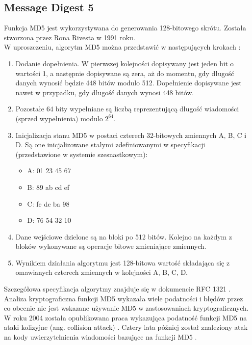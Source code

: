 \subsection{Message Digest 5}
Funkcja MD5 jest wykorzystywana do generowania 128-bitowego skrótu. Została stworzona przez Rona Rivesta w 1991 roku. \\
W uproszczeniu, algorytm MD5 można przedstawić w następujących krokach \cite{crypto101}:
\begin{enumerate}
	\item Dodanie dopełnienia. W pierwszej kolejności dopisywany jest jeden bit o wartości 1, a następnie dopisywane są zera, aż do momentu, gdy długość danych wynosić będzie 448 bitów modulo 512. Dopełnienie dopisywane jest nawet w przypadku, gdy długość danych wynosi 448 bitów.
	\item Pozostałe 64 bity wypełniane są liczbą reprezentującą długość wiadomości (sprzed wypełnienia) modulo $2^{64}$. 
	\item Inicjalizacja stanu MD5 w postaci czterech 32-bitowych zmiennych A, B, C i D. Są one inicjalizowane stałymi zdefiniowanymi w specyfikacji (przedstawione w systemie szesnastkowym): 
		\begin{itemize}
			\item A: 01 23 45 67
			\item B: 89 ab cd ef
			\item C: fe dc ba 98
			\item D: 76 54 32 10
		\end{itemize}
	\item Dane wejściowe dzielone są na bloki po 512 bitów. Kolejno na każdym z bloków wykonywane są operacje bitowe zmieniające zmiennych. 
	\item Wynikiem działania algorytmu jest 128-bitowa wartość składająca się z omawianych czterech zmiennych w kolejności A, B, C, D.
\end{enumerate} 
Szczegółowa specyfikacja algorytmy znajduje się w dokumencie RFC 1321 \cite{md5rfc}. \\
Analiza kryptograficzna funkcji MD5 wykazała wiele podatności i błędów przez co obecnie nie jest wskazane używanie MD5 w zastosowaniach kryptograficznych. 
W roku 2004 została opublikowana praca wykazująca podatność funkcji MD5 na ataki kolizyjne (ang. collision attack) \cite{md5cert}. Cztery lata później został znaleziony atak na kody uwierzytelnienia wiadomości bazujące na funkcji MD5 \cite{md5hmac}.

